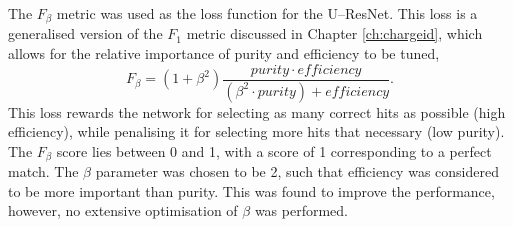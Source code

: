 The $F_\beta$ metric\cite{VanRijsbergenC.J.1975Ir} was used as the loss
function for the U--ResNet. This loss is a generalised version of the $F_1$
metric discussed in Chapter \ref{ch:chargeid}, which allows for the relative
importance of purity and efficiency to be tuned,
\begin{equation*}
	F_\beta = \left( 1 + \beta^2\right) \frac{purity \cdot
	efficiency}{\left(\beta^2 \cdot purity\right) + efficiency}.
\end{equation*}
This loss rewards the network for selecting as many correct hits as possible
(high efficiency), while penalising it for selecting more hits that necessary 
(low purity). The $F_\beta$ score lies between 0 and 1, with a score of 1 
corresponding to a perfect match. The $\beta$ parameter was chosen to be 2, 
such that efficiency was considered to be more important than purity. This was 
found to improve the performance, however, no extensive optimisation of $\beta$ 
was performed.

